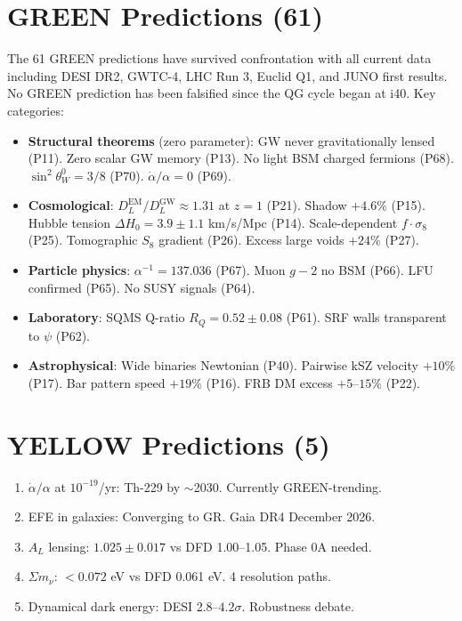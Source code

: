 \documentclass[11pt,a4paper]{article}
\begin{document}
\section{GREEN Predictions (61)}

The 61 GREEN predictions have survived confrontation with all current data including DESI DR2, GWTC-4, LHC Run 3, Euclid Q1, and JUNO first results. No GREEN prediction has been falsified since the QG cycle began at i40. Key categories:

\begin{itemize}
\item \textbf{Structural theorems} (zero parameter): GW never gravitationally lensed (P11). Zero scalar GW memory (P13). No light BSM charged fermions (P68). $\sin^2\theta_W^0 = 3/8$ (P70). $\dot{\alpha}/\alpha = 0$ (P69).
\item \textbf{Cosmological}: $D_L^\text{EM}/D_L^\text{GW} \approx 1.31$ at $z = 1$ (P21). Shadow $+4.6\%$ (P15). Hubble tension $\Delta H_0 = 3.9 \pm 1.1$ km/s/Mpc (P14). Scale-dependent $f \cdot \sigma_8$ (P25). Tomographic $S_8$ gradient (P26). Excess large voids $+24\%$ (P27).
\item \textbf{Particle physics}: $\alpha^{-1} = 137.036$ (P67). Muon $g-2$ no BSM (P66). LFU confirmed (P65). No SUSY signals (P64).
\item \textbf{Laboratory}: SQMS Q-ratio $R_Q = 0.52 \pm 0.08$ (P61). SRF walls transparent to $\psi$ (P62).
\item \textbf{Astrophysical}: Wide binaries Newtonian (P40). Pairwise kSZ velocity $+10\%$ (P17). Bar pattern speed $+19\%$ (P16). FRB DM excess $+5$--$15\%$ (P22).
\end{itemize}

\section{YELLOW Predictions (5)}

\begin{enumerate}
\item $\dot{\alpha}/\alpha$ at $10^{-19}$/yr: Th-229 by $\sim$2030. Currently GREEN-trending.
\item EFE in galaxies: Converging to GR. Gaia DR4 December 2026.
\item $A_L$ lensing: $1.025 \pm 0.017$ vs DFD 1.00--1.05. Phase 0A needed.
\item $\Sigma m_\nu$: $< 0.072$ eV vs DFD 0.061 eV. 4 resolution paths.
\item Dynamical dark energy: DESI 2.8--$4.2\sigma$. Robustness debate.
\end{enumerate}
\end{document}
